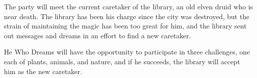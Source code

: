 The party will meet the current caretaker of the library, an old elven druid who is near death.
The library has been his charge since the city was destroyed, but the strain of maintaining the magic has been too great for him, and the library sent out messages and dreams in an effort to find a new caretaker.

He Who Dreams will have the opportunity to participate in three challenges, one each of plants, animals, and nature, and if he succeeds, the library will accept him as the new caretaker.
